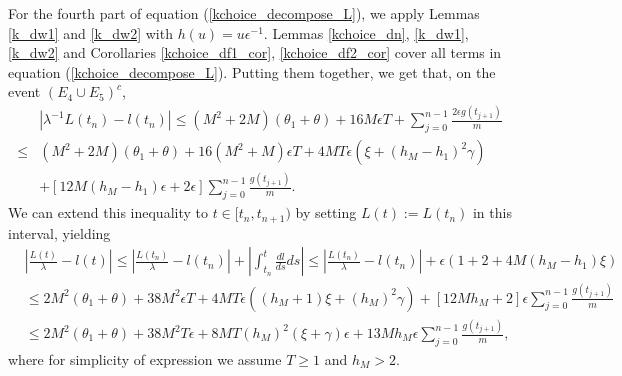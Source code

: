\documentclass[12pt]{article}
\numberwithin{equation}{section}  %
\begin{document}
For the fourth part of equation (\ref{kchoice_decompose_L}), we apply Lemmas \ref{k_dw1} and \ref{k_dw2} with $h(u)=u\epsilon^{-1}$. 
Lemmas \ref{kchoice_dn}, \ref{k_dw1}, \ref{k_dw2} and Corollaries \ref{kchoice_df1_cor}, \ref{kchoice_df2_cor} cover all terms in equation (\ref{kchoice_decompose_L}). Putting them together, we get that, on the event $(E_{4}\cup E_{5})^c$,
\begin{align*}
&\left|
\lambda^{-1}L(t_n)-l(t_n)
\right|
\leq (M^2+2M)(\theta_1+\theta)+16M\epsilon T+\sum_{j=0}^{n-1} \frac{2\epsilon g(t_{j+1})}{m}\\
\leq& (M^2+2M)(\theta_1+\theta)+16(M^2+M)\epsilon T+4 M T\epsilon(\xi+(h_M - h_1)^2\gamma)\\
&+\left[12M(h_M-h_1)\epsilon+2\epsilon\right]\sum_{j=0}^{n-1} \frac{ g(t_{j+1})}{m}.
\end{align*} 
We can extend this inequality to $t\in[t_n,t_{n+1})$ by setting $L(t):=L(t_n)$ in this interval, yielding
{\small
\begin{align} 
&\left|\frac{L(t)}{\lambda}-l(t)\right|\leq \left|\frac{L(t_n)}{\lambda}-l(t_n)\right|+\left|\int_{t_n}^t\frac{dl}{ds}ds\right|\leq \left|\frac{L(t_n)}{\lambda}-l(t_n)\right|+\epsilon(1+2+4M(h_M-h_1)\xi)\nonumber\\
&\leq 2M^2(\theta_1+\theta)+38M^2\epsilon T+4 M T\epsilon((h_M+1)\xi+(h_M)^2\gamma)+\left[12 M h_M  + 2\right]\epsilon\sum_{j=0}^{n-1} \frac{ g(t_{j+1})}{m}\nonumber\\
&\leq 2M^2(\theta_1+\theta)+38M^2 T \epsilon +8 M T (h_M)^2(\xi+\gamma)\epsilon+13 M h_M  \epsilon\sum_{j=0}^{n-1} \frac{ g(t_{j+1})}{m}\label{k_el},
\end{align}}
where for simplicity of expression we assume $T\geq 1$ and $h_M>2$.
\end{document}

